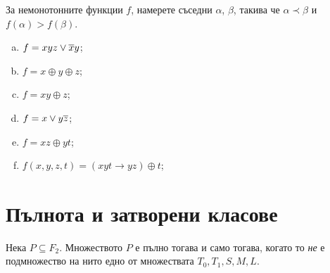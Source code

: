 \begin{problem}
  За немонотонните функции $f$, намерете съседни $\alpha$, $\beta$, такива че
  $\alpha \prec \beta$ и $f(\alpha) > f(\beta)$.\\
  \begin{enumerate}[a)]
  \item
    $f = xyz \vee \overline{x}y$;
  \item
    $f = x\oplus y\oplus z$;
  \item
    $f = xy\oplus z$;
  \item
    $f = x\vee y\overline{z}$;
  \item
    $f = xz\oplus yt$;
  \item
    $f(x,y,z,t) = (xyt\rightarrow yz)\oplus t$;
  \end{enumerate}
\end{problem}


\section{Пълнота и затворени класове}

\begin{thm}
  Нека $P\subseteq F_2$. Множеството $P$ е пълно тогава и само тогава, когато то {\em не} е подмножество на 
  нито едно от множествата $T_0,T_1,S,M,L$.
\end{thm}


